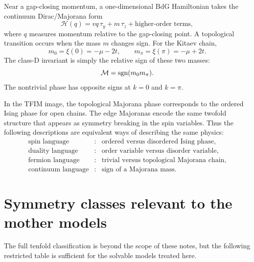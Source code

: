 Near a gap-closing momentum, a one-dimensional BdG Hamiltonian takes the
continuum Dirac/Majorana form
\begin{equation}
\label{eq:topo-continuum-majorana-dirac}
    \mathcal{H}(q)=v q\,\tau_y+m\,\tau_z+\text{higher-order terms},
\end{equation}
where $q$ measures momentum relative to the gap-closing point.  A topological
transition occurs when the mass $m$ changes sign.  For the Kitaev chain,
\begin{equation}
\label{eq:topo-kitaev-masses}
    m_0=\xi(0)=-\mu-2t,
    \qquad
    m_\pi=\xi(\pi)=-\mu+2t.
\end{equation}
The class-D invariant is simply the relative sign of these two masses:
\begin{equation}
\label{eq:topo-mass-sign-invariant}
    \mathcal{M}=\operatorname{sgn}(m_0m_\pi).
\end{equation}
The nontrivial phase has opposite signs at $k=0$ and $k=\pi$.

In the TFIM image, the topological Majorana phase corresponds to the ordered
Ising phase for open chains.  The edge Majoranas encode the same twofold
structure that appears as symmetry breaking in the spin variables.  Thus the
following descriptions are equivalent ways of describing the same physics:
\begin{equation}
\label{eq:topo-tfim-equivalent-descriptions}
\begin{array}{ccl}
\text{spin language} &:& \text{ordered versus disordered Ising phase},\\[2pt]
\text{duality language} &:& \text{order variable versus disorder variable},\\[2pt]
\text{fermion language} &:& \text{trivial versus topological Majorana chain},\\[2pt]
\text{continuum language} &:& \text{sign of a Majorana mass}.
\end{array}
\end{equation}

\section{Symmetry classes relevant to the mother models}
\label{sec:topo-symmetry-classes}

The full tenfold classification is beyond the scope of these notes, but the
following restricted table is sufficient for the solvable models treated here.

